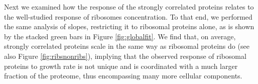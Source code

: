 Next we examined how the response of the strongly correlated proteins relates to the well-studied response of ribosomes concentration.
To that end, we performed the same analysis of slopes, restricting it to ribosomal proteins alone, as is shown by the stacked green bars in Figure \ref{fig:globalfit}.
We find that, on average, strongly correlated proteins scale in the same way as ribosomal proteins do (see also Figure \ref{fig:ribsnonribs}), implying that the observed response of ribosomal proteins to growth rate is not unique and is coordinated with a much larger fraction of the proteome, thus encompassing many more cellular components.
